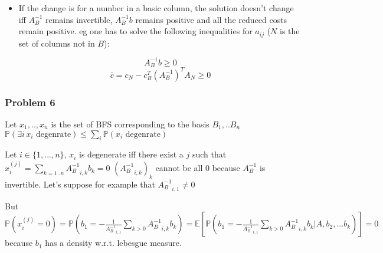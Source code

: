\documentclass[12pt]{article}
\newcommand{\Q}[1]{\subsubsection*{Problem #1}}
\begin{document}
\begin{itemize}
\begin{itemize}
\item If the change is for a number in a basic column, the solution doesn't change iff $A_B^{-1}$ remains invertible, $A_B^{-1}b$ remains positive and all the reduced costs remain positive. eg one has to solve the following inequalities for $a_{ij}$ ($N$ is the set of columns not in $B$):

$$ A_B^{-1} b \geq 0$$
$$ \bar c = c_N - c_B^T(A_B^{-1})^TA_N \geq 0$$

\end{itemize}


\end{itemize}
\Q{6}

Let $x_1,..,x_n$ is the set of BFS corresponding to the basis $B_1,..B_n$
$\mathbb{P}( \exists i \, x_i \text{ degenrate}) \leq \sum_i \mathbb{P}( x_i \text{ degenrate})$

Let $i \in \{1, ..., n\}$, $x_i$ is degenerate iff there exist a $j$ such that $x_i^{(j)} = \sum_{k=1..n} {A_B^{-1}}_{i,k} b_k = 0$
$({A_B^{-1}}_{i,k})_k$ cannot be all 0 because $A_B^{-1}$ is invertible. Let's suppose for example that ${A_B^{-1}}_{i,1} \neq 0$

But $\mathbb{P}(x_i^{(j)} = 0) = \mathbb{P}( b_1 = -\frac{1}{{A_B^{-1}}_{i,1}} \sum_{k > 0}{A_B^{-1}}_{i,k} b_k) = \mathbb{E} \left[ \mathbb{P}( b_1 = -\frac{1}{{A_B^{-1}}_{i,1}} \sum_{k > 0}{A_B^{-1}}_{i,k} b_k | A, b_2, ... b_k) \right] = 0$ because $b_1$ has a density w.r.t. lebesgue measure.
\end{document}

